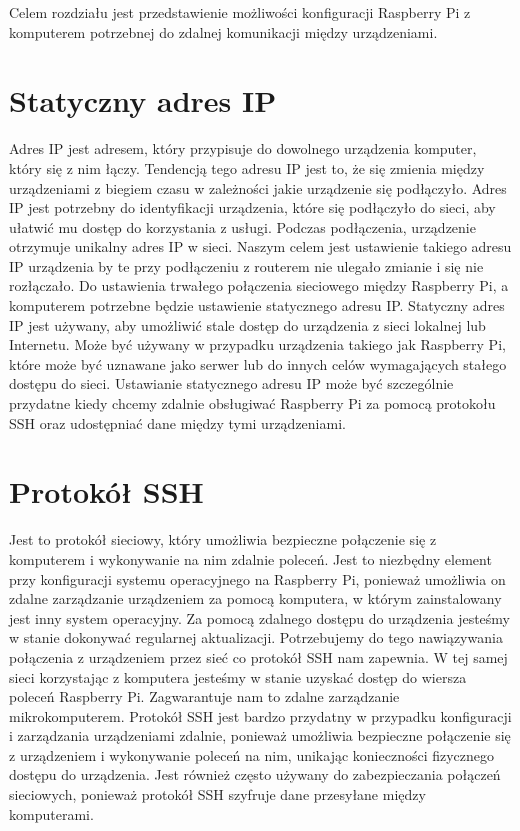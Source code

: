 Celem rozdziału jest przedstawienie możliwości konfiguracji Raspberry Pi z komputerem potrzebnej do zdalnej komunikacji między urządzeniami.
\section{Statyczny adres IP}
Adres IP jest adresem, który przypisuje do dowolnego urządzenia komputer, który się z nim łączy. Tendencją tego adresu IP jest to, że się zmienia między urządzeniami z biegiem czasu w zależności jakie urządzenie się podłączyło. Adres IP jest potrzebny do identyfikacji urządzenia, które się podłączyło do sieci, aby ułatwić mu dostęp do korzystania z usługi. Podczas podłączenia, urządzenie otrzymuje unikalny adres IP w sieci. Naszym celem jest ustawienie takiego adresu IP urządzenia by te przy podłączeniu z routerem nie ulegało zmianie i się nie rozłączało. Do ustawienia trwałego połączenia sieciowego między Raspberry Pi, a komputerem potrzebne będzie ustawienie statycznego adresu IP. Statyczny adres IP jest używany, aby umożliwić stale dostęp do urządzenia z sieci lokalnej lub Internetu. Może być używany w przypadku urządzenia takiego jak Raspberry Pi, które może być uznawane jako serwer lub do innych celów wymagających stałego dostępu do sieci. Ustawianie statycznego adresu IP może być szczególnie przydatne kiedy chcemy zdalnie obsługiwać Raspberry Pi za pomocą protokołu SSH oraz udostępniać dane między tymi urządzeniami. 
\section{Protokół SSH}
Jest to protokół sieciowy, który umożliwia bezpieczne połączenie się z komputerem i wykonywanie na nim zdalnie poleceń. Jest to niezbędny element przy konfiguracji systemu operacyjnego na Raspberry Pi, ponieważ umożliwia on zdalne zarządzanie urządzeniem za pomocą komputera, w którym zainstalowany jest inny system operacyjny. Za pomocą zdalnego dostępu do urządzenia jesteśmy w stanie dokonywać regularnej aktualizacji. Potrzebujemy do tego nawiązywania połączenia z urządzeniem przez sieć co protokół SSH nam zapewnia. W tej samej sieci korzystając z komputera jesteśmy w stanie uzyskać dostęp do wiersza poleceń Raspberry Pi. Zagwarantuje nam to zdalne zarządzanie mikrokomputerem. Protokół SSH jest bardzo przydatny w przypadku konfiguracji i zarządzania urządzeniami zdalnie, ponieważ umożliwia bezpieczne połączenie się z urządzeniem i wykonywanie poleceń na nim, unikając konieczności fizycznego dostępu do urządzenia. Jest również często używany do zabezpieczania połączeń sieciowych, ponieważ protokół SSH szyfruje dane przesyłane między komputerami.